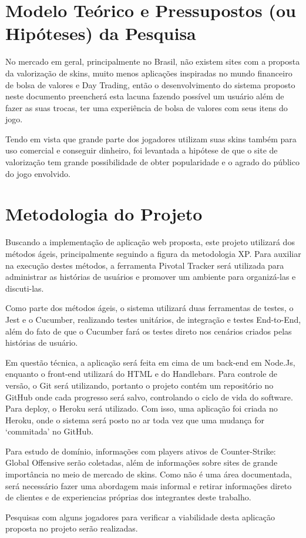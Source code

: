 \chapter{Modelo Teórico e Pressupostos (ou Hipóteses) da Pesquisa}
No mercado em geral, principalmente no Brasil, não existem sites com a proposta da valorização de skins, muito menos aplicações inspiradas no mundo financeiro de bolsa de valores e Day Trading, então o desenvolvimento do sistema proposto neste documento preencherá esta lacuna fazendo possível um usuário além de fazer as suas trocas, ter uma experiência de bolsa de valores com seus itens do jogo. 

Tendo em vista que grande parte dos jogadores utilizam suas skins também para uso comercial e conseguir dinheiro, foi levantada a hipótese de que o site de valorização tem grande possibilidade de obter popularidade e o agrado do público do jogo envolvido.

\chapter{Metodologia do Projeto}
Buscando a implementação de aplicação web proposta, este projeto utilizará dos métodos ágeis, principalmente seguindo a figura da metodologia XP. Para auxiliar na execução destes métodos, a ferramenta Pivotal Tracker será utilizada para administrar as histórias de usuários e promover um ambiente para organizá-las e discuti-las.

Como parte dos métodos ágeis, o sistema utilizará duas ferramentas de testes, o Jest e o Cucumber, realizando testes unitários, de integração e testes End-to-End, além do fato de que o Cucumber fará os testes direto nos cenários criados pelas histórias de usuário.

Em questão técnica, a aplicação será feita em cima de um back-end em Node.Js, enquanto o front-end utilizará do HTML e do Handlebars. Para controle de versão, o Git será utilizando, portanto o projeto contém um repositório no GitHub onde cada progresso será salvo, controlando o ciclo de vida do software. Para deploy, o Heroku será utilizado. Com isso, uma aplicação foi criada no Heroku, onde o sistema será posto no ar toda vez que uma mudança for ‘commitada’ no GitHub.

Para estudo de domínio, informações com players ativos de Counter-Strike: Global Offensive serão coletadas, além de informações sobre sites de grande importância no meio de mercado de skins. Como não é uma área documentada, será necessário fazer uma abordagem mais informal e retirar informações direto de clientes e de experiencias próprias dos integrantes deste trabalho.

Pesquisas com alguns jogadores para verificar a viabilidade desta aplicação proposta no projeto serão realizadas.

